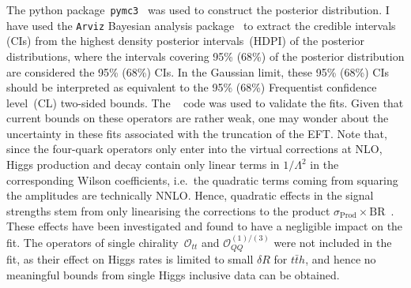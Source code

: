 \par	The python package~\texttt{pymc3}~\cite{Salvatier2016} was used to construct the posterior distribution. I have used the \texttt{Arviz} Bayesian analysis package~\cite{arviz_2019} to extract the credible intervals (CIs) from the highest density posterior intervals~(HDPI) of the posterior distributions, where the intervals covering 95\% (68\%) of the posterior distribution are considered the 95\% (68\%) CIs. In the Gaussian limit, these  95\% (68\%) CIs should be interpreted as equivalent to the 95\%  (68\%) Frequentist  confidence level~(CL) two-sided bounds. The \HEPfit~\cite{deBlas:2019okz} code was used to validate the fits.
	Given that current bounds on these operators are rather weak, one may wonder about the uncertainty in these fits associated with the truncation of the EFT.
	Note that, since the four-quark operators only enter into the virtual corrections at NLO, Higgs production and decay contain only linear terms in $1/\Lambda^{2}$ in the corresponding Wilson coefficients, i.e.~the quadratic terms coming from squaring the amplitudes are technically NNLO. 
	Hence, quadratic effects in the signal strengths stem from only linearising the corrections to the product $\sigma_\mathrm{ Prod} \times \mathrm{ BR}$~\!.  These effects have been investigated and found to have a negligible impact on the fit. 
	The operators of single chirality~$\mathcal O_{tt}$ and $\mathcal{O}_{QQ}^{(1)/(3)}$ were not included in the fit, as their effect on Higgs rates is limited to small $\delta R$ for $t\bar t h$, and hence no meaningful bounds from single Higgs inclusive data can be obtained.
	\newpage
	\begingroup
	 
	\endgroup
	\FloatBarrier
